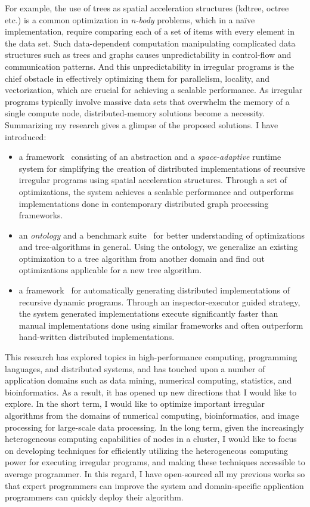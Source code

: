 For example, the use of trees as spatial acceleration structures (kdtree, octree etc.) is a common optimization in {\em n-body} problems, which in a na\"ive implementation, require comparing each of a set of items with every element in the data set. 
Such data-dependent computation manipulating complicated data structures such as trees and graphs causes unpredictability in control-flow and communication patterns. 
And this unpredictability in irregular programs is the chief obstacle in effectively optimizing them for parallelism, locality, and vectorization, which are crucial for achieving a scalable performance. 
As irregular programs typically involve massive data sets that overwhelm the memory of a single compute node, distributed-memory solutions become a necessity. 
Summarizing my research gives a glimpse of the proposed solutions. I have introduced:
\begin{itemize}
\item a framework~\cite{hegde17ics} consisting of an abstraction and a {\em space-adaptive} runtime system for simplifying the creation of distributed implementations of recursive irregular programs using spatial acceleration structures. Through a set of optimizations, the system achieves a scalable performance and outperforms implementations done in contemporary distributed graph processing frameworks.
\item an {\em ontology} and a benchmark suite~\cite{hegde17ispass} for better understanding of optimizations and tree-algorithms in general. Using the ontology, we generalize an existing optimization to a tree algorithm from another domain and find out optimizations applicable for a new tree algorithm.
\item a framework~\cite{hegde19d2p} for automatically generating distributed implementations of recursive dynamic programs. Through an inspector-executor guided strategy, the system generated implementations execute significantly faster than manual implementations done using similar frameworks and often outperform hand-written distributed implementations.
\end{itemize} 
 
This research has explored topics in high-performance computing, programming languages, and distributed systems, and has touched upon a number of application domains such as data mining, numerical computing, statistics, and bioinformatics. 
As a result, it has opened up new directions that I would like to explore. In the short term, I would like to optimize important irregular algorithms from the domains of numerical computing, bioinformatics, and image processing for large-scale data processing.
In the long term, given the increasingly heterogeneous computing capabilities of nodes in a cluster, I would like to focus on developing techniques for efficiently utilizing the heterogeneous computing power for executing irregular programs, and making these techniques accessible to average programmer. 
In this regard, I have open-sourced all my previous works so that expert programmers can improve the system and domain-specific application programmers can quickly deploy their algorithm.  

